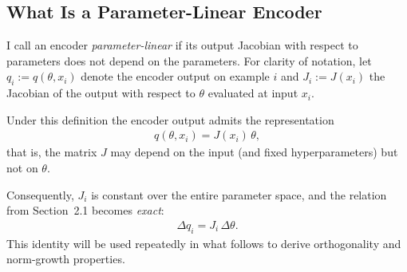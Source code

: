 \subsection{What Is a Parameter-Linear Encoder}

I call an encoder \emph{parameter-linear} if its output Jacobian with respect to parameters does not depend on the parameters. For clarity of notation, let
\( q_i := q(\theta, x_i) \) denote the encoder output on example $i$ and
\( J_i := J(x_i) \) the Jacobian of the output with respect to $\theta$ evaluated at input $x_i$.

Under this definition the encoder output admits the representation
\begin{align}
q(\theta, x_i) = J(x_i)\,\theta, \label{eq:param-linear-def}
\end{align}
that is, the matrix $J$ may depend on the input (and fixed hyperparameters) but not on $\theta$.

Consequently, $J_i$ is constant over the entire parameter space, and the relation from Section~2.1 becomes \emph{exact}:
\begin{align}
\Delta q_i = J_i\,\Delta\theta. \label{eq:exact-delta-q}
\end{align}
This identity will be used repeatedly in what follows to derive orthogonality and norm-growth properties.



